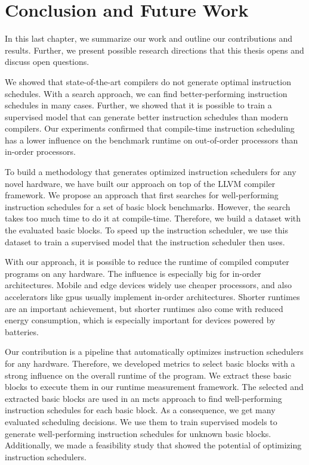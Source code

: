 \chapter{Conclusion and Future Work}
\label{sec:conclusion}
In this last chapter, we summarize our work and outline our contributions and results.
Further, we present possible research directions that this thesis opens and discuss open questions.

We showed that state-of-the-art compilers do not generate optimal instruction schedules.
With a search approach, we can find better-performing instruction schedules in many cases.
Further, we showed that it is possible to train a supervised model that can generate better instruction schedules than modern compilers.
Our experiments confirmed that compile-time instruction scheduling has a lower influence on the benchmark runtime on out-of-order processors than in-order processors.

To build a methodology that generates optimized instruction schedulers for any novel hardware, we have built our approach on top of the LLVM compiler framework.
We propose an approach that first searches for well-performing instruction schedules for a set of basic block benchmarks.
However, the search takes too much time to do it at compile-time.
Therefore, we build a dataset with the evaluated basic blocks.
To speed up the instruction scheduler, we use this dataset to train a supervised model that the instruction scheduler then uses.

With our approach, it is possible to reduce the runtime of compiled computer programs on any hardware.
The influence is especially big for in-order architectures.
Mobile and edge devices widely use cheaper processors, and also accelerators like \acp{gpu} usually implement in-order architectures.
Shorter runtimes are an important achievement, but shorter runtimes also come with reduced energy consumption, which is especially important for devices powered by batteries.

Our contribution is a pipeline that automatically optimizes instruction schedulers for any hardware.
Therefore, we developed metrics to select basic blocks with a strong influence on the overall runtime of the program.
We extract these basic blocks to execute them in our runtime measurement framework.
The selected and extracted basic blocks are used in an \ac{mcts} approach to find well-performing instruction schedules for each basic block.
As a consequence, we get many evaluated scheduling decisions.
We use them to train supervised models to generate well-performing instruction schedules for unknown basic blocks.
Additionally, we made a feasibility study that showed the potential of optimizing instruction schedulers.

